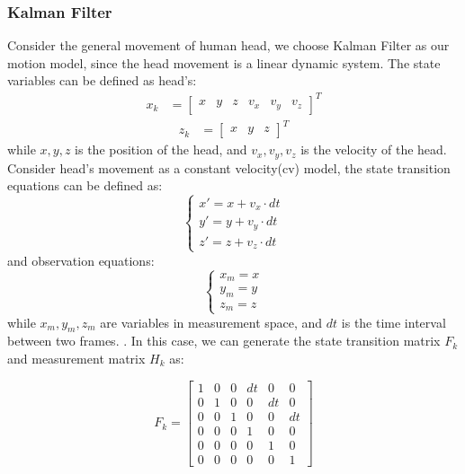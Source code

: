 \subsubsection{Kalman Filter}
Consider the general movement of human head, we choose Kalman Filter as our motion model, since the head movement is a linear dynamic system. The state variables can be defined as head's:
\begin{equation}
    \begin{aligned}
        x_k &= \begin{bmatrix} x & y & z & v_x & v_y & v_z \end{bmatrix}^T
    \end{aligned}
\end{equation}
\begin{equation}
    \begin{aligned}
        z_k &= \begin{bmatrix} x & y & z \end{bmatrix}^T
    \end{aligned}
\end{equation}
while $x, y, z$ is the position of the head, and $v_x, v_y, v_z$ is the velocity of the head. 
Consider head's movement as a constant velocity(cv) model, the state transition equations can be defined as:
\begin{equation}
    \begin{cases}
        x' = x + v_{x} \cdot dt \\
        y' = y + v_{y} \cdot dt \\
        z' = z + v_{z} \cdot dt 
    \end{cases}
\end{equation}
and observation equations:
\begin{equation}
    \begin{cases}
        x_m = x \\
        y_m = y \\
        z_m = z
    \end{cases}
\end{equation}
while $x_m, y_m, z_m$ are variables in measurement space, and $dt$ is the time interval between two frames. 
.
In this case, we can generate the state transition matrix $F_k$ and measurement matrix $H_k$ as:

\begin {equation}
    F_k = \begin{bmatrix} 1 & 0 & 0 & dt & 0 & 0 \\ 0 & 1 & 0 & 0 & dt & 0 \\ 0 & 0 & 1 & 0 & 0 & dt \\ 0 & 0 & 0 & 1 & 0 & 0 \\ 0 & 0 & 0 & 0 & 1 & 0 \\ 0 & 0 & 0 & 0 & 0 & 1 \end{bmatrix} 
\end {equation}

